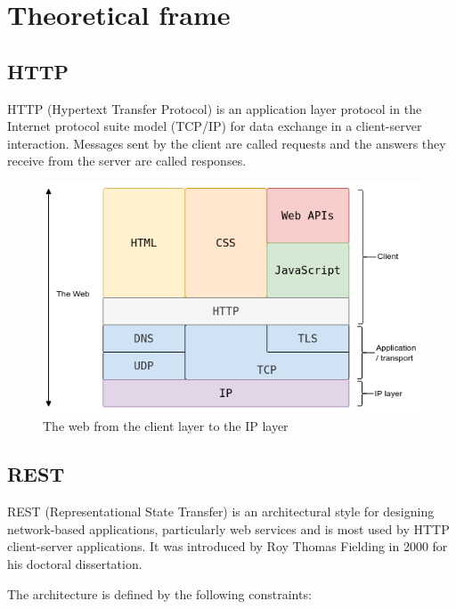 \chapter{Theoretical frame}
\label{chap:ch1}

\section{HTTP}

\par HTTP (Hypertext Transfer Protocol) is an application layer protocol in the Internet protocol suite model (TCP/IP) for data exchange in a client-server interaction. Messages sent by the client are called requests and the answers they receive from the server are called responses. 

\begin{figure}[!ht]
    \centering
    \includegraphics[width=1\linewidth]{web-layering.png}
    \caption{The web from the client layer to the IP layer \cite{httpOverviewLayers} }
    \label{fig:enter-label}
\end{figure}

\section{REST}

\par REST (Representational State Transfer) is an architectural style for designing network-based applications, particularly web services and is most used by HTTP client-server applications. It was introduced by Roy Thomas Fielding in 2000 for his doctoral dissertation. \cite{restPaper}

\par The architecture is defined by the following constraints:

